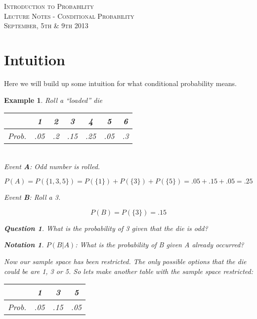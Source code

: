 \documentclass{article}
\newtheorem*{nota}{Notation}
\newtheorem*{q}{Question}
\newtheorem{ex}{Example}
\newcommand{\classname}{
Introduction to Probability
}
\begin{document}
\begin{center}
\textsc{\Large \classname}\\[.3cm]
\textsc{\Large Lecture Notes - Conditional Probability}\\[.3cm]
\textsc{\large September, 5th \& 9th 2013}
\end{center}


\section*{Intuition}
Here we will build up some intuition for what conditional probability means.
\begin{ex}
Roll a ``loaded'' die\\
\begin{tabular}{r | c c c c c c}
      & 1   & 2  & 3   & 4   & 5   & 6 \\
\hline
Prob. & .05 & .2 & .15 & .25 & .05 & .3
\end{tabular}\\[.3cm]

Event \textbf{A}: Odd number is rolled.

\begin{equation} \label{PofA}
  P(A) = P(\{1,3,5\}) = P(\{1\}) + P(\{3\}) + P(\{5\}) = .05 + .15 + .05 = .25
\end{equation}

Event \textbf{B}: Roll a 3.

\begin{equation} \label{PofB}
  P(B) = P(\{3\}) = .15
\end{equation}

\begin{q}What is the probability of 3 given that the die is odd?\end{q}

\begin{nota}
  $P(B|A)$: What is the probability of B given A already occurred?
\end{nota}

Now our sample space has been restricted. The only possible options that the die could be are 1, 3 or 5. So lets make another table with the sample space restricted:

\begin{tabular}{r | c c c}
      & 1   & 3   & 5 \\
\hline
Prob. & .05 & .15 & .05 
\end{tabular}\\[.3cm]


\end{ex}
\end{document}
